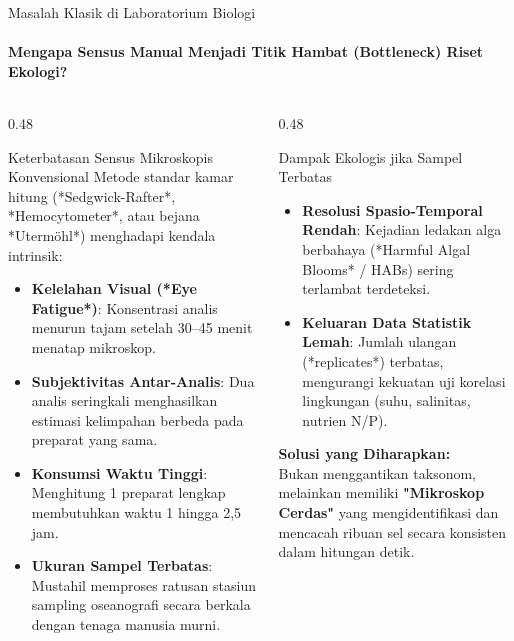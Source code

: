 \documentclass[aspectratio=169, 10pt]{beamer}
\begin{document}
\begin{frame}{Masalah Klasik di Laboratorium Biologi}
    \framesubtitle{Mengapa Sensus Manual Menjadi Titik Hambat (Bottleneck) Riset Ekologi?}
    
    \begin{columns}[T]
        \begin{column}{0.48\textwidth}
            \begin{alertcard}{Keterbatasan Sensus Mikroskopis Konvensional}
                \scriptsize
                Metode standar kamar hitung (*Sedgwick-Rafter*, *Hemocytometer*, atau bejana *Utermöhl*) menghadapi kendala intrinsik:
                \begin{itemize}\setlength\itemsep{3pt}
                    \item \textbf{Kelelahan Visual (*Eye Fatigue*)}: Konsentrasi analis menurun tajam setelah 30--45 menit menatap mikroskop.
                    \item \textbf{Subjektivitas Antar-Analis}: Dua analis seringkali menghasilkan estimasi kelimpahan berbeda pada preparat yang sama.
                    \item \textbf{Konsumsi Waktu Tinggi}: Menghitung 1 preparat lengkap membutuhkan waktu 1 hingga 2,5 jam.
                    \item \textbf{Ukuran Sampel Terbatas}: Mustahil memproses ratusan stasiun sampling oseanografi secara berkala dengan tenaga manusia murni.
                \end{itemize}
            \end{alertcard}
        \end{column}
        
        \begin{column}{0.48\textwidth}
            \begin{biocard}{Dampak Ekologis jika Sampel Terbatas}
                \scriptsize
                \begin{itemize}\setlength\itemsep{4pt}
                    \item \textbf{Resolusi Spasio-Temporal Rendah}: Kejadian ledakan alga berbahaya (*Harmful Algal Blooms* / HABs) sering terlambat terdeteksi.
                    \item \textbf{Keluaran Data Statistik Lemah}: Jumlah ulangan (*replicates*) terbatas, mengurangi kekuatan uji korelasi lingkungan (suhu, salinitas, nutrien N/P).
                \end{itemize}
                \tcblower
                \textbf{\color{OceanDeep}Solusi yang Diharapkan:}\\
                Bukan menggantikan taksonom, melainkan memiliki \textbf{"Mikroskop Cerdas"} yang mengidentifikasi dan mencacah ribuan sel secara konsisten dalam hitungan detik.
            \end{biocard}
        \end{column}
    \end{columns}
\end{frame}
\end{document}
